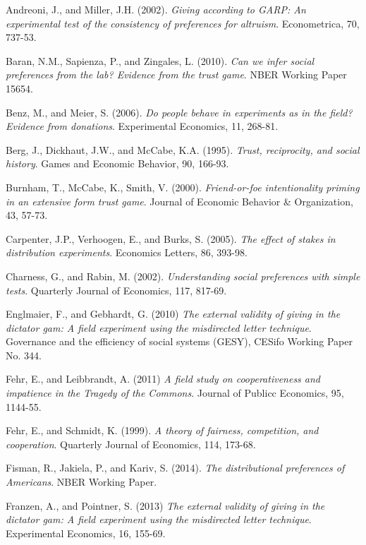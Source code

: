 \documentclass{article}
\begin{document}
\begin{thebibliography}{9}

Andreoni, J., and Miller, J.H. (2002).
\textit{Giving according to GARP: An experimental test of the consistency of preferences for altruism}.
Econometrica, 70, 737-53.

Baran, N.M., Sapienza, P., and Zingales, L. (2010).
\textit{Can we infer social preferences from the lab? Evidence from the trust game}.
NBER Working Paper 15654.

Benz, M., and Meier, S. (2006).
\textit{Do people behave in experiments as in the field? Evidence from donations}.
Experimental Economics, 11, 268-81.

Berg, J., Dickhaut, J.W., and McCabe, K.A. (1995).
\textit{Trust, reciprocity, and social history}.
Games and Economic Behavior, 90, 166-93.

Burnham, T., McCabe, K., Smith, V. (2000).
\textit{Friend-or-foe intentionality priming in an extensive form trust game}.
Journal of Economic Behavior \& Organization, 43, 57-73.

Carpenter, J.P., Verhoogen, E., and Burks, S. (2005).
\textit{The effect of stakes in distribution experiments}.
Economics Letters, 86, 393-98.

Charness, G., and Rabin, M. (2002).
\textit{Understanding social preferences with simple tests}.
Quarterly Journal of Economics, 117, 817-69.

Englmaier, F., and Gebhardt, G. (2010)
\textit{The external validity of giving in the dictator gam: A field experiment using the misdirected letter technique}.
Governance and the efficiency of social systems (GESY), CESifo Working Paper No. 344.

Fehr, E., and Leibbrandt, A. (2011)
\textit{A field study on cooperativeness and impatience in the Tragedy of the Commons}.
Journal of Publicc Economics, 95, 1144-55.

Fehr, E., and Schmidt, K. (1999).
\textit{A theory of fairness, competition, and cooperation}.
Quarterly Journal of Economics, 114, 173-68.




Fisman, R., Jakiela, P., and Kariv, S. (2014).
\textit{The distributional preferences of Americans}.
NBER Working Paper.

Franzen, A., and Pointner, S. (2013)
\textit{The external validity of giving in the dictator gam: A field experiment using the misdirected letter technique}.
Experimental Economics, 16, 155-69.


\end{thebibliography}
\end{document}
